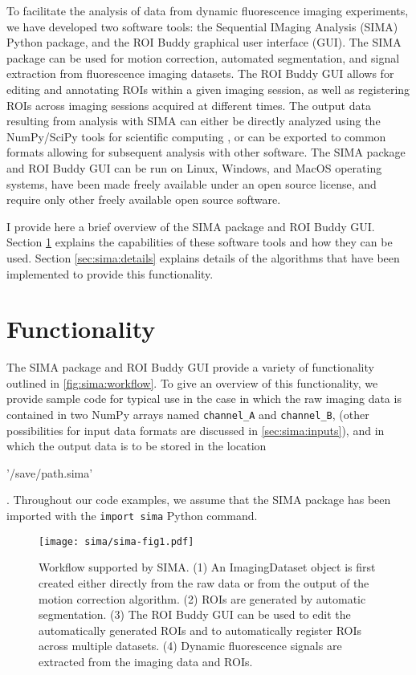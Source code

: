 To facilitate the analysis of data from dynamic fluorescence imaging experiments,
we have developed two software tools:
the Sequential IMaging Analysis (SIMA) Python package,
and the ROI Buddy graphical user interface (GUI).
The SIMA package can be used for motion correction, automated segmentation,
and signal extraction from fluorescence imaging datasets.
The ROI Buddy GUI allows for editing and annotating ROIs
within a given imaging session, as well as registering ROIs across imaging sessions acquired at different times.
The output data resulting from analysis with SIMA can either be directly
analyzed using the NumPy/SciPy tools for scientific computing 
\citep{Oliphant2007, Jones2001}, or can be exported to common formats
allowing for subsequent analysis with other software.
The SIMA package and ROI Buddy GUI can be run on Linux, Windows, and MacOS
operating systems, have been made freely available under an open source
license, and require only other freely available open source software.

I provide here a brief overview of the SIMA package and ROI Buddy GUI.
Section \ref{sec:sima:functionality} explains the capabilities of these software
tools and how they can be used.
Section \ref{sec:sima:details} explains details of the algorithms that have
been implemented to provide this functionality.


\section{Functionality}
\label{sec:sima:functionality}
The SIMA package and ROI Buddy GUI provide a variety of functionality outlined in \autoref{fig:sima:workflow}.
To give an overview of this functionality, we provide sample code for typical use
in the case in which the raw imaging data is contained in two NumPy arrays
named \verb|channel_A| and \verb|channel_B|,
(other possibilities for input data formats are discussed in \autoref{sec:sima:inputs}),
and in which the output data is to be stored in the location 
\begin{verb}'/save/path.sima'\end{verb}.
Throughout our code examples, we assume that the SIMA package has been imported
with the \verb|import sima| Python command.

\begin{figure}[ht]
\centering
\texttt{[image: sima/sima-fig1.pdf]}
\caption[Workflow supported by SIMA]{
 Workflow supported by SIMA. 
 (1) An ImagingDataset object is first created either directly from the raw data
 or from the output of the motion correction algorithm.
 (2) ROIs are generated by automatic segmentation.
 (3) The ROI Buddy GUI can be used to edit the automatically generated ROIs and to
 automatically register ROIs across multiple datasets.
 (4) Dynamic fluorescence signals are extracted from the imaging data and ROIs.}
 \label{fig:sima:workflow}
\end{figure}

